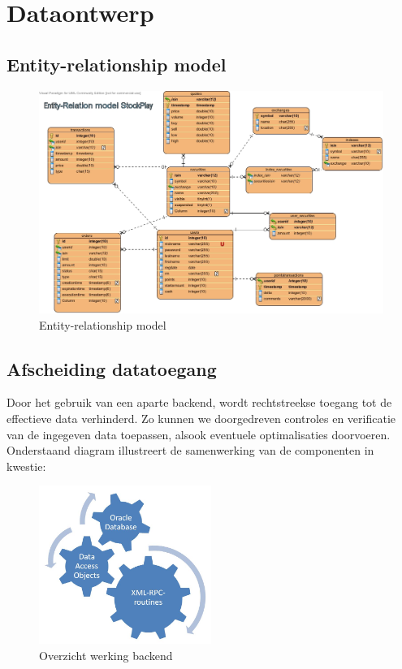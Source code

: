 %
%

\chapter{Dataontwerp}

\section{Entity-relationship model}
\begin{figure}[h!]
	\centering
		\includegraphics[width=\textwidth]{images/realisatie/ER_Diagram}
	\caption{Entity-relationship model}
\end{figure}

\section{Afscheiding datatoegang}

Door het gebruik van een aparte backend, wordt rechtstreekse toegang tot de effectieve data verhinderd. Zo kunnen we doorgedreven controles en verificatie van de ingegeven data toepassen, alsook eventuele optimalisaties doorvoeren. Onderstaand diagram illustreert de samenwerking van de componenten in kwestie:

\begin{figure}[h!]
	\centering
		\includegraphics[width=0.5\textwidth]{images/realisatie/Class_Diagram}
	\caption{Overzicht werking backend}
\end{figure}

